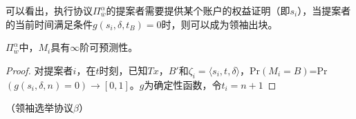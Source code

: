 可以看出，执行协议$\Pi^{\alpha}_{\bar{w}}$的提案者需要提供某个账户的权益证明（即$s_i$），当提案者的当前时间满足条件$g(s_i,\delta,t_B)=0$时，则可以成为领袖出块。

\begin{corollary}
$\Pi_{\bar{w}}^\alpha$中，$M_i$具有$\infty$阶可预测性。	
\end{corollary}

\begin{proof}
 对提案者$i$，在$t$时刻，已知$Tx$，$B'$和$\zeta_i=\langle s_i,t,\delta\rangle$，Pr$(M_i=B)$=Pr$(g(s_i,\delta,n)=0)\rightarrow[0,1]$。$g$为确定性函数，令$t_i=n+1$
\end{proof}

\begin{definition}
（领袖选举协议$\beta$） 
\end{definition}

